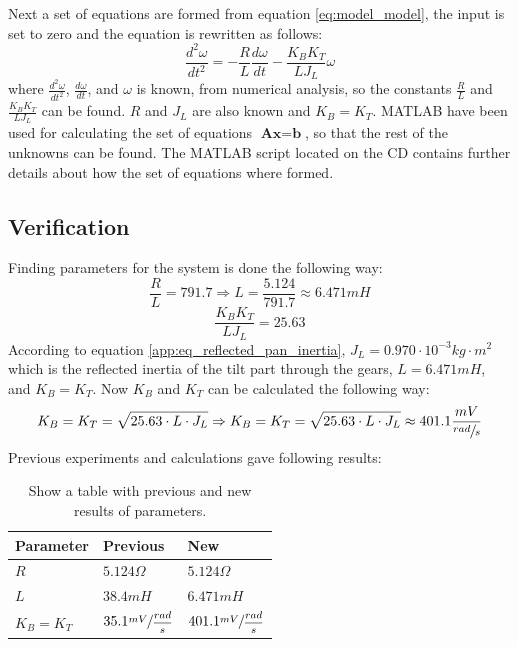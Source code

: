 Next a set of equations are formed from equation \ref{eq:model_model}, the input is set to zero and the equation is rewritten as follows:
\begin{equation}
	\frac{d^{2}\omega}{dt^{2}} = - \frac{R}{L} \frac{d\omega}{dt} - \frac{K_B K_T}{L J_L} \omega
\end{equation}
where $\frac{d^{2}\omega}{dt^{2}}$, $\frac{d\omega}{dt}$, and $\omega$ is known, from numerical analysis, so the constants $\frac{R}{L}$ and $\frac{K_B K_T}{L J_L}$ can be found. $R$ and $J_L$ are also known and $K_B = K_T$. MATLAB have been used for calculating the set of equations $\textbf{Ax} = \textbf{b}$, so that the rest of the unknowns can be found. The MATLAB script located on the CD contains further details about how the set of equations where formed.

\subsection{Verification}
Finding parameters for the system is done the following way:
\begin{equation}
	\frac{R}{L} = 791.7 \Rightarrow L = \frac{5.124}{791.7} \approx 6.471mH
\end{equation}
\begin{equation}
	\frac{K_B K_T}{L J_L} = 25.63\label{eq:constants}
\end{equation}
According to equation \ref{app:eq_reflected_pan_inertia}, $J_L = 0.970 \cdot 10^{-3} kg \cdot m^{2}$ which is the reflected inertia of the tilt part through the gears, $L = 6.471mH$, and $K_B = K_T$. Now $K_B$ and $K_T$ can be calculated the following way:
\begin{equation}
	K_B = K_T = \sqrt{25.63 \cdot L \cdot J_L} \Rightarrow K_B = K_T = \sqrt{25.63 \cdot L \cdot J_L} \approx 401.1 \frac{mV}{\sfrac{rad}{s}}
\end{equation}
Previous experiments\cite{DCMOTOR} and calculations gave following results:
\begin{table}[htb]				
	\centering
	\begin{tabular}{lll}			
Parameter & Previous & New \\			
	\midrule												
$R$ & $5.124\Omega$ & $5.124\Omega$\\
$L$ & $38.4mH$ & $6.471mH$\\
$K_B = K_T$ & $35.1\sfrac{mV}{\dfrac{rad}{s}}$ & $401.1\sfrac{mV}{\dfrac{rad}{s}}$\\
	\end{tabular}
	\caption{Show a table with previous and new results of parameters.}				
	\label{tab:newparameters}			
\end{table}

